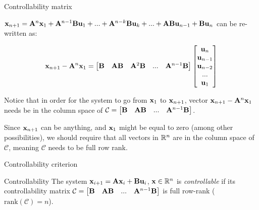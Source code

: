 \documentclass{beamer}
\begin{document}
\begin{frame}{Controllability matrix}
\begin{flushleft}

$\mathbf{x}_{n+1} = \mathbf{A}^n \mathbf{x}_1 + \mathbf{A}^{n-1} \mathbf{B} \mathbf{u}_1 + ... 
+ \mathbf{A}^{n - k} \mathbf{B} \mathbf{u}_{k} + ... +
\mathbf{A} \mathbf{B} \mathbf{u}_{n-1} + \mathbf{B} \mathbf{u}_n$ can be re-written as:

\begin{equation}
    \mathbf{x}_{n+1} - \mathbf{A}^n \mathbf{x}_1 = 
    \begin{bmatrix}
    \mathbf{B} &
    \mathbf{A} \mathbf{B} &
    \mathbf{A}^2 \mathbf{B} & ... &
    \mathbf{A}^{n - 1} \mathbf{B}
    \end{bmatrix}    
    \begin{bmatrix}
    \mathbf{u}_{n} \\
    \mathbf{u}_{n-1} \\
    \mathbf{u}_{n-2} \\ ... \\
    \mathbf{u}_{1}
    \end{bmatrix}
\end{equation}

Notice that in order for the system to go from $\mathbf{x}_1$ to $\mathbf{x}_{n+1}$, vector $\mathbf{x}_{n+1} - \mathbf{A}^n \mathbf{x}_1$ needs be in the column space of $\mathcal{C} = \begin{bmatrix}
    \mathbf{B} &
    \mathbf{A} \mathbf{B} & ... &
    \mathbf{A}^{n - 1} \mathbf{B}
    \end{bmatrix}$.

Since $\mathbf{x}_{n+1}$ can be anything, and $\mathbf{x}_1$ might be equal to zero (among other possibilities), we should require that all vectors in $\mathbb{R}^n$ are in the column space of $\mathcal{C}$, meaning $\mathcal{C}$ needs to be full row rank.

\end{flushleft}
\end{frame}


\begin{frame}{Controllability criterion}
\begin{flushleft}

\begin{block}{Controllability}
The system $\mathbf{x}_{i+1} = \mathbf{A}  \mathbf{x}_i + \mathbf{B} \mathbf{u}_i$, $\mathbf{x} \in \mathbb{R}^n$ is \emph{controllable} if its controllability matrix $\mathcal{C} = \begin{bmatrix}
    \mathbf{B} &
    \mathbf{A} \mathbf{B} & ... &
    \mathbf{A}^{n - 1} \mathbf{B}
    \end{bmatrix}$ is full row-rank ($\text{rank}(\mathcal{C}) = n$).
\end{block}

\end{flushleft}
\end{frame}
\end{document}
